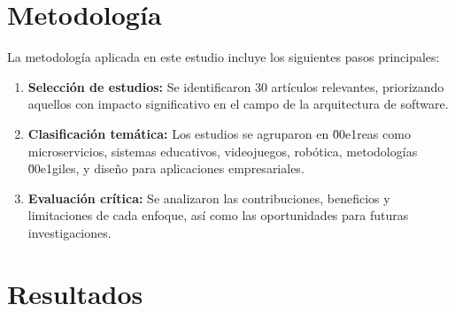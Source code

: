 \documentclass[conference]{IEEEtran}
\begin{document}
\section{Metodolog\'ia}
La metodolog\'ia aplicada en este estudio incluye los siguientes pasos principales:
\begin{enumerate}
    \item \textbf{Selecci\'on de estudios:} Se identificaron 30 art\'iculos relevantes, priorizando aquellos con impacto significativo en el campo de la arquitectura de software.
    \item \textbf{Clasificaci\'on tem\'atica:} Los estudios se agruparon en \u00e1reas como microservicios, sistemas educativos, videojuegos, rob\'otica, metodolog\'ias \u00e1giles, y dise\~no para aplicaciones empresariales.
    \item \textbf{Evaluaci\'on cr\'itica:} Se analizaron las contribuciones, beneficios y limitaciones de cada enfoque, as\'i como las oportunidades para futuras investigaciones.
\end{enumerate}

\section{Resultados}
\end{document}
